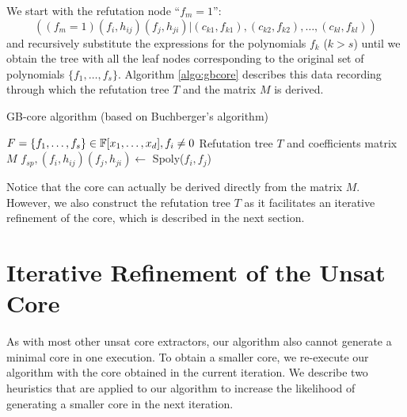 We start with the refutation node ``$f_m=1$'':
\begin{displaymath}
((f_{m}=1)(f_{i},h_{ij})(f_{j},h_{ji})| (c_{k1},f_{k1}),(c_{k2},f_{k2}),\dots,(c_{kl},f_{kl}))
\end{displaymath}
and recursively substitute the expressions for the polynomials $f_k$
($k>s$) until we obtain the tree with all the leaf nodes corresponding
to the original set of polynomials $\{f_1,\dots,f_s\}$. Algorithm
\ref{algo:gbcore} describes this data recording through which the
refutation tree $T$ and the matrix $M$ is derived. 

\begin{algorithm}[H]
 \caption{GB-core algorithm (based on Buchberger's algorithm)}
 \label{algo:gbcore}
 \begin{algorithmic}[1]

 \REQUIRE $F = \{f_1, \dots, f_s\} \in {\mathbb{F}}[x_1, \dots, x_d], f_i\neq 0$
 \ENSURE Refutation tree $T$ and coefficients matrix $M$
 	\STATE  $f_{sp},(f_{i},h_{ij})(f_{j},h_{ji}) \gets$ Spoly($f_i,f_j$) 
 	\ENDIF
 	\ENDIF
 \ENDFOR
 \end{algorithmic}
 \end{algorithm}


Notice that the core can actually be derived directly from the matrix 
$M$. However, we also construct the refutation tree $T$ as it
facilitates an iterative refinement of the core, which is described
in the next section. 

\section{Iterative Refinement of the Unsat Core}
\label{sec:iter}

As with most other unsat core extractors, our algorithm also cannot
generate a minimal core in one execution. To obtain a smaller core, we
 re-execute our algorithm with the core obtained in the current
iteration. We describe two heuristics that are applied to our
algorithm to increase the likelihood of generating a smaller core in
the next iteration.  

